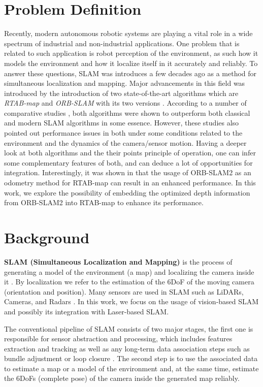 \documentclass[12pt]{article}
\begin{document}
\section{Problem Definition}
Recently, modern autonomous robotic systems are playing a vital role in a wide spectrum of industrial and non-industrial applications. One problem that is related to such application is robot perception of the environment, as such how it models the environment and how it localize itself in it accurately and reliably. To answer these questions, SLAM was introduces a few decades ago as a method for simultaneous localization and mapping. Major advancements in this field was introduced by the introduction of two state-of-the-art algorithms which are \textit{RTAB-map} \cite{labbe2019rtab} and \textit{ORB-SLAM} with its two versions \cite{mur2015orb}\cite{mur2017orb}. According to a number of comparative studies \cite{study2018}\cite{8710464}, both algorithms were shown to outperform both classical and modern SLAM algorithms in some essence. However, these studies also pointed out performance issues in both under some conditions related to the environment and the dynamics of the camera/sensor motion. Having a deeper look at both algorithms and the their points principle of operation, one can infer some complementary features of both, and can deduce a lot of opportunities for integration. Interestingly, it was shown in \cite{labbe2019rtab} that the usage of ORB-SLAM2 as an odometry method for RTAB-map can result in an enhanced performance. In this work, we explore the possibility of embedding the optimized depth information from ORB-SLAM2 into RTAB-map to enhance its performance.
\section{Background}
\indent \textbf{SLAM (Simultaneous Localization and Mapping)} is the process of generating a model of the environment (a map) and localizing the camera inside it \cite{cadena2016past}. By localization we refer to the estimation of the 6DoF of the moving camera (orientation and position). Many sensors are used in SLAM such as LiDARs, Cameras, and Radars \cite{bresson2017simultaneous}. In this work, we focus on the usage of vision-based SLAM and possibly its integration with Laser-based SLAM.

The conventional pipeline of SLAM consists of two major stages, the first one is responsible for sensor abstraction and processing, which includes features extraction and tracking as well as any long-term data association steps such as bundle adjustment or loop closure \cite{bresson2017simultaneous}\cite{cadena2016past}. The second step is to use the associated data to estimate a map or a model of the environment and, at the same time, estimate the 6DoFs (complete pose) of the camera inside the generated map reliably. 
\end{document}
